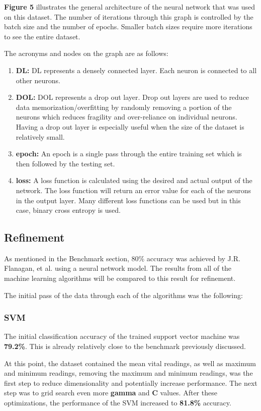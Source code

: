 \documentclass[11pt]{article}
\begin{document}
	\textbf{Figure 5} illustrates the general architecture of the neural network that was used on this dataset. The number of iterations through this graph is controlled by the batch size and the number of epochs. Smaller batch sizes require more iterations to see the entire dataset.
	
	The acronyms and nodes on the graph are as follows:
	\begin{enumerate}
		\item \textbf{DL:} DL represents a densely connected layer. Each neuron is connected to all other neurons.
		\item \textbf{DOL:} DOL represents a drop out layer. Drop out layers are used to reduce data memorization/overfitting by randomly removing a portion of the neurons which reduces fragility and over-reliance on individual neurons. Having a drop out layer is especially useful when the size of the dataset is relatively small.
		\item \textbf{epoch:}  An epoch is a single pass through the entire training set which is then followed by the testing set.
		\item \textbf{loss:} A loss function is calculated using the desired and actual output of the network. The loss function will return an error value for each of the neurons in the output layer. Many different loss functions can be used but in this case, binary cross entropy is used.
	\end{enumerate}

	\subsection{Refinement}
	As mentioned in the Benchmark section, 80\% accuracy was achieved by J.R. Flanagan, et al. using a neural network model. The results from all of the machine learning algorithms will be compared to this result for refinement.
	
	The initial pass of the data through each of the algorithms was the following:
	
	\subsubsection{SVM}
    The initial classification accuracy of the trained support vector machine was \textbf{79.2\%}. This is already relatively close to the benchmark previously discussed.

	At this point, the dataset contained the mean vital readings, as well as maximum and minimum readings, removing the maximum and minimum readings, was the first step to reduce dimensionality and potentially increase performance. The next step was to grid search even more \textbf{gamma} and \textbf{C} values. After these optimizations, the performance of the SVM increased to \textbf{81.8\%} accuracy.
	
\end{document}
